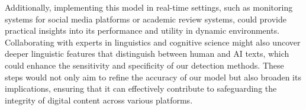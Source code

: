 \documentclass{article}
\begin{document}
Additionally, implementing this model in real-time settings, such as monitoring systems for social media platforms or academic review systems, could provide practical insights into its performance and utility in dynamic environments. Collaborating with experts in linguistics and cognitive science might also uncover deeper linguistic features that distinguish between human and AI texts, which could enhance the sensitivity and specificity of our detection methods. These steps would not only aim to refine the accuracy of our model but also broaden its implications, ensuring that it can effectively contribute to safeguarding the integrity of digital content across various platforms.

 

\newpage
\small

\newpage



\end{document}

